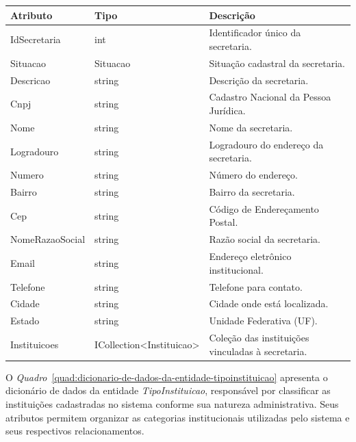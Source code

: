 \begin{quadro}[H]
\caption[Dicionário de dados da entidade Secretaria]{Dicionário de dados da entidade Secretaria}
\label{quad:dicionario-de-dados-da-entidade-secretaria}

\begin{tabular}{|p{}|p{}|p{}|}
\hline
\textbf{Atributo} & \textbf{Tipo} & \textbf{Descrição} \\ 
\hline
IdSecretaria & int & Identificador único da secretaria. \\ 
\hline
Situacao & Situacao & Situação cadastral da secretaria. \\ 
\hline
Descricao & string & Descrição da secretaria. \\ 
\hline
Cnpj & string & Cadastro Nacional da Pessoa Jurídica. \\ 
\hline
Nome & string & Nome da secretaria. \\ 
\hline
Logradouro & string & Logradouro do endereço da secretaria. \\ 
\hline
Numero & string & Número do endereço. \\ 
\hline
Bairro & string & Bairro da secretaria. \\ 
\hline
Cep & string & Código de Endereçamento Postal. \\ 
\hline
NomeRazaoSocial & string & Razão social da secretaria. \\ 
\hline
Email & string & Endereço eletrônico institucional. \\ 
\hline
Telefone & string & Telefone para contato. \\ 
\hline
Cidade & string & Cidade onde está localizada. \\ 
\hline
Estado & string & Unidade Federativa (UF). \\ 
\hline
Instituicoes & ICollection<Instituicao> & Coleção das instituições vinculadas à secretaria. \\ 
\hline
\end{tabular}


\end{quadro}


O \textit{Quadro}~\ref{quad:dicionario-de-dados-da-entidade-tipoinstituicao} apresenta o dicionário de dados da entidade \textit{TipoInstituicao}, responsável por classificar as instituições cadastradas no sistema conforme sua natureza administrativa. Seus atributos permitem organizar as categorias institucionais utilizadas pelo sistema e seus respectivos relacionamentos.

